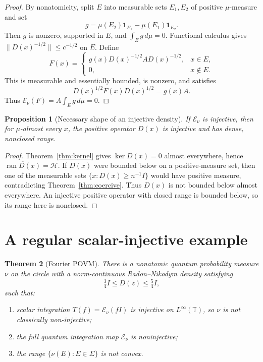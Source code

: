 \documentclass[11pt]{article}
\newtheorem{theorem}{Theorem}[section]
\newtheorem{proposition}[theorem]{Proposition}
\newcommand{\E}{\mathcal E}
\newcommand{\T}{\mathbb T}
\begin{document}
\begin{proof}
By nonatomicity, split $E$ into measurable sets $E_1,E_2$ of positive
$\mu$-measure and set
\[
 g=\mu(E_2)\mathbf 1_{E_1}-\mu(E_1)\mathbf 1_{E_2}.
\]
Then $g$ is nonzero, supported in $E$, and $\int_Eg\,d\mu=0$.  Functional
calculus gives $\|D(x)^{-1/2}\|\le c^{-1/2}$ on $E$.  Define
\[
 F(x)=
 \begin{cases}
 g(x)D(x)^{-1/2}AD(x)^{-1/2},&x\in E,\\
 0,&x\notin E.
 \end{cases}
\]
This is measurable and essentially bounded, is nonzero, and satisfies
\[
 D(x)^{1/2}F(x)D(x)^{1/2}=g(x)A.
\]
Thus $\E_\nu(F)=A\int_Eg\,d\mu=0$.
\end{proof}

\begin{proposition}[Necessary shape of an injective density]
If $\E_\nu$ is injective, then for $\mu$-almost every $x$, the positive
operator $D(x)$ is injective and has dense, nonclosed range.
\end{proposition}

\begin{proof}
Theorem~\ref{thm:kernel} gives $\ker D(x)=0$ almost everywhere, hence
$\overline{\operatorname{ran}D(x)}=\mathcal H$.  If $D(x)$ were bounded
below on a positive-measure set, then one of the measurable sets
$\{x:D(x)\ge n^{-1}I\}$ would have positive measure, contradicting
Theorem~\ref{thm:coercive}.  Thus $D(x)$ is not bounded below almost
everywhere.  An injective positive operator with closed range is bounded
below, so its range here is nonclosed.
\end{proof}

\section{A regular scalar-injective example}

\begin{theorem}[Fourier POVM]\label{thm:fourier}
There is a nonatomic quantum probability measure $\nu$ on the circle with a
norm-continuous Radon--Nikodym density satisfying
\[
 \tfrac34 I\le D(z)\le\tfrac54 I,
\]
such that:
\begin{enumerate}
\item scalar integration $T(f)=\E_\nu(fI)$ is injective on
      $L^\infty(\T)$, so $\nu$ is not classically non-injective;
\item the full quantum integration map $\E_\nu$ is noninjective;
\item the range $\{\nu(E):E\in\Sigma\}$ is not convex.
\end{enumerate}
\end{theorem}
\end{document}

